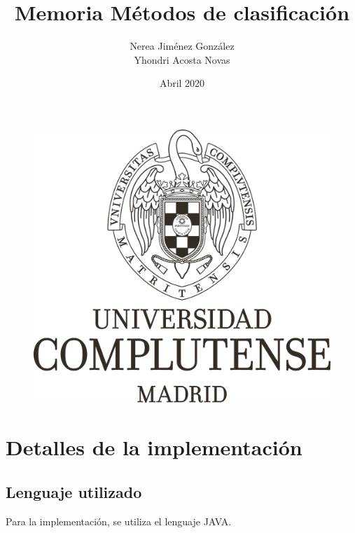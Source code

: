 \documentclass[12pt]{article}
\title{Memoria Métodos de clasificación}
\author{Nerea Jiménez González\\ Yhondri Acosta Novas}
\date{Abril 2020}
\begin{document}
\maketitle
\begin{figure}[H]
    \centering
    \includegraphics[width=1\textwidth]{3-2016-07-21-Marca UCM Monocromo Negro.png}
\end{figure}

\newpage
\tableofcontents
\listoffigures
\newpage

\section{Detalles de la implementación}
\subsection{Lenguaje utilizado}
Para la implementación, se utiliza el lenguaje JAVA.
\end{document}

